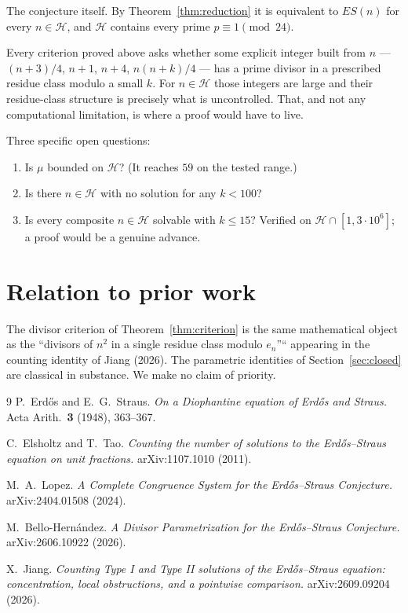 \documentclass[11pt,a4paper]{article}
\theoremstyle{definition}
\begin{document}
The conjecture itself. By Theorem~\ref{thm:reduction} it is equivalent to $ES(n)$
for every $n\in\mathcal H$, and $\mathcal H$ contains every prime
$p\equiv 1\pmod{24}$.

Every criterion proved above asks whether some explicit integer built from $n$
--- $(n+3)/4$, $n+1$, $n+4$, $n(n+k)/4$ --- has a prime divisor in a prescribed
residue class modulo a small $k$. For $n\in\mathcal H$ those integers are large
and their residue-class structure is precisely what is uncontrolled. That, and
not any computational limitation, is where a proof would have to live.

Three specific open questions:
\begin{enumerate}
\item Is $\mu$ bounded on $\mathcal H$? (It reaches $59$ on the tested range.)
\item Is there $n\in\mathcal H$ with no solution for any $k<100$?
\item Is every composite $n\in\mathcal H$ solvable with $k\le 15$? Verified on
  $\mathcal H\cap[1,3\cdot 10^{6}]$; a proof would be a genuine advance.
\end{enumerate}

\section*{Relation to prior work}

The divisor criterion of Theorem~\ref{thm:criterion} is the same mathematical
object as the ``divisors of $n^{2}$ in a single residue class modulo
$e_n$''`` appearing in the counting identity of Jiang (2026). The parametric
identities of Section~\ref{sec:closed} are classical in substance. We make no
claim of priority.

\begin{thebibliography}{9}
 P.~Erd\H{o}s and E.~G.~Straus.
  \emph{On a Diophantine equation of Erd\H{o}s and Straus.}
  Acta Arith.\ \textbf{3} (1948), 363--367.

 C.~Elsholtz and T.~Tao.
  \emph{Counting the number of solutions to the Erd\H{o}s--Straus equation on
  unit fractions.} arXiv:1107.1010 (2011).

 M.~A.~Lopez.
  \emph{A Complete Congruence System for the Erd\H{o}s--Straus Conjecture.}
  arXiv:2404.01508 (2024).

 M.~Bello-Hern\'andez.
  \emph{A Divisor Parametrization for the Erd\H{o}s--Straus Conjecture.}
  arXiv:2606.10922 (2026).

 X.~Jiang.
  \emph{Counting Type I and Type II solutions of the Erd\H{o}s--Straus
  equation: concentration, local obstructions, and a pointwise comparison.}
  arXiv:2609.09204 (2026).
\end{thebibliography}
\end{document}
